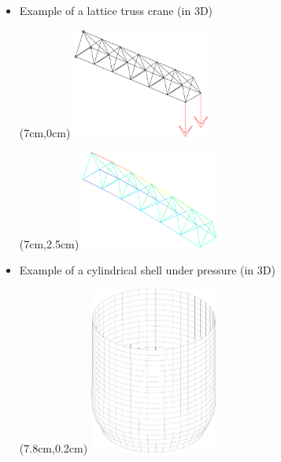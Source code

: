 \begin{frame}{}
  \begin{itemize}
    \item {}
             {Example of a lattice truss crane (in 3D)}
    \begin{textblock*}{6cm}(7cm,0cm)
      \includegraphics[width=4.5cm]{images/treillis_grue_3d.1}
    \end{textblock*}
    \begin{textblock*}{6cm}(7cm,2.5cm)
      \includegraphics[width=4.5cm]{images/treillis_grue_3d.2}
    \end{textblock*}
    
  \end{itemize}
  \vspace{1cm}
\end{frame}

\begin{frame}{}
  \begin{itemize}
    \item {}
             {Example of a cylindrical shell under pressure (in 3D)}
    \begin{textblock*}{6cm}(7.8cm,0.2cm)
      \includegraphics[height=5.5cm]{images/coque_3d}
    \end{textblock*}
    
  \end{itemize}
  \vspace{1cm}
\end{frame}


